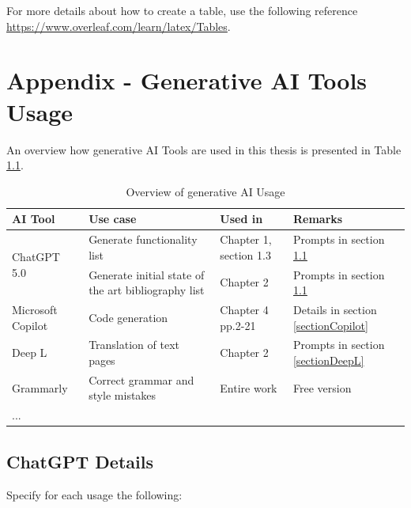 \documentclass[12pt,a4paper]{book}
\theoremstyle{definition}
\theoremstyle{remark}
\begin{document}
For more details about how to create a table, use the following reference \url{https://www.overleaf.com/learn/latex/Tables}.






\appendix
\chapter{Appendix - Generative AI Tools Usage}
\label{genAIUsage}

An overview how  generative AI Tools are used in this thesis is presented in Table \ref{tab:genAIOverview}.

\begin{table}[h!]
    \centering
    \begin{tabularx}{\textwidth}{|l|X|X|X|}
            \hline \rowcolor{blue!20}
         AI Tool& Use case & Used in & Remarks \\\hline
         \multirow{2}{*}{ChatGPT 5.0} & Generate functionality list & Chapter 1, section 1.3& Prompts in section \ref{sectionGhatGPT}\\ \cline{2-4}
          
          & Generate initial state of the art bibliography list & Chapter 2 & Prompts in section \ref{sectionGhatGPT}\\ \hline
         
         Microsoft Copilot & Code generation & Chapter 4 pp.2-21  & Details in section \ref{sectionCopilot}\\ \hline
         Deep L &  Translation of text pages & Chapter 2 & Prompts in section \ref{sectionDeepL} \\ \hline
         Grammarly & Correct grammar and style mistakes & Entire work & Free version\\ \hline
         ... &  & & \\\hline
    \end{tabularx}
    \caption{Overview of generative AI Usage}
    \label{tab:genAIOverview}
\end{table}




    
\section{ChatGPT Details} 
\label{sectionGhatGPT}

Specify for each usage the following:
\end{document}
